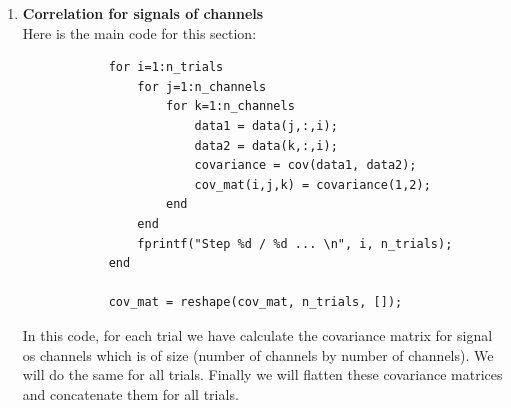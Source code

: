 \documentclass[]{article}
\begin{document}
\begin{enumerate}
		\item \textbf{Correlation for signals of channels}\\
		Here is the main code for this section:
		\begin{lstlisting}
			for i=1:n_trials
				for j=1:n_channels
					for k=1:n_channels
						data1 = data(j,:,i);
						data2 = data(k,:,i);
						covariance = cov(data1, data2);
						cov_mat(i,j,k) = covariance(1,2);
					end
				end
				fprintf("Step %d / %d ... \n", i, n_trials);
			end
			
			cov_mat = reshape(cov_mat, n_trials, []);
		\end{lstlisting}
		In this code, for each trial we have calculate the covariance matrix for signal os channels which is of size (number of channels by number of channels). We will do the same for all trials. Finally we will flatten these covariance matrices and concatenate them for all trials.
	\end{enumerate}
	
\end{document}

